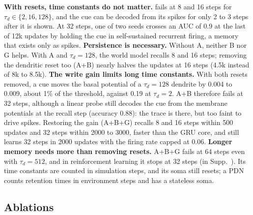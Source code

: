 \textbf{With resets, time constants do not matter.}
\swm fails at 8 and 16 steps for $\tau_d\in\{2,16,128\}$, and the cue can be decoded from its spikes for only 2 to 3 steps after it is shown.
At 32 steps, one of two seeds crosses an AUC of 0.9 at the last of 12k updates by holding the cue in self-sustained recurrent firing, a memory that exists only as spikes.
\textbf{Persistence is necessary.}
Without A, neither B nor G helps.
With A and $\tau_d=128$, the world model recalls 8 and 16 steps; removing the dendritic reset too (A+B) nearly halves the updates at 16 steps (4.5k instead of 8k to 8.5k).
\textbf{The write gain limits long time constants.}
With both resets removed, a cue moves the basal potential of a $\tau_d=128$ dendrite by 0.004 to 0.009, about 1\% of the threshold, against 0.19 at $\tau_d=2$.
A+B therefore fails at 32 steps, although a linear probe still decodes the cue from the membrane potentials at the recall step (accuracy 0.88): the trace is there, but too faint to drive spikes.
Restoring the gain (A+B+G) recalls 8 and 16 steps within 500 updates and 32 steps within 2000 to 3000, faster than the GRU core, and still learns 32 steps in 2000 updates with the firing rate capped at 0.06.
\textbf{Longer memory needs more than removing resets.}
A+B+G fails at 64 steps even with $\tau_d=512$, and in reinforcement learning it stops at 32 steps (\swmnr in Supp.~).
Its time constants are counted in simulation steps, and its soma still resets; a PDN counts retention times in environment steps and has a stateless soma.

\subsection{Ablations}
\label{sec:ablation}

\begin{table}[t]
  \centering\tabfont
  \caption{\textbf{Ablations} on the world model probes (as in \cref{tab:probe}). Each row changes one design choice of \method.}
  \label{tab:ablation}
  
\end{table}

